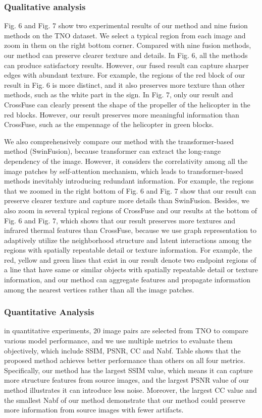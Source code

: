 \documentclass[journal]{IEEEtran}
\begin{document}
\subsubsection{Qualitative analysis}
Fig. 6 and Fig. 7 show two experimental results of our method and nine fusion methods on the TNO dataset. We select a typical region from each image and zoom in them on the right bottom corner. Compared with nine fusion methods, our method can preserve clearer texture and details. In Fig. 6, all the methods can produce satisfactory results. However, our fused result can capture sharper edges with abundant texture. For example, the regions of the red block of our result in Fig. 6 is more distinct, and it also preserves more texture than other methods, such as the white part in the sign. In Fig. 7, only our result and CrossFuse can clearly present the shape of the propeller of the helicopter in the red blocks. However, our result preserves more meaningful information than CrossFuse, such as the empennage of the helicopter in green blocks.

We also comprehensively compare our method with the transformer-based method (SwinFusion), because transformer can extract the long-range dependency of the image. However, it considers the correlativity among all the image patches by self-attention mechanism, which leads to transformer-based methods inevitably introducing redundant information. For example, the regions that we zoomed in the right bottom of Fig. 6 and Fig. 7 show that our result can preserve clearer texture and capture more details than SwinFusion. Besides, we also zoom in several typical regions of CrossFuse and our results at the bottom of Fig. 6 and Fig. 7, which shows that our result preserves more textures and infrared thermal features than CrossFuse, because we use graph representation to adaptively utilize the neighborhood structure and latent interactions among the regions with spatially repeatable detail or texture information. For example, the red, yellow and green lines that exist in our result denote two endpoint regions of a line that have same or similar objects with spatially repeatable detail or texture information, and our method can aggregate features and propagate information among the nearest vertices rather than all the image patches.


\subsubsection{Quantitative Analysis}
in quantitative experiments, 20 image pairs are selected from TNO to compare various model performance, and we use multiple metrics to evaluate them objectively, which include SSIM, PSNR, CC and Nabf. Table \uppercase\expandafter{} shows that the proposed method achieves better performance than others on all four metrics. Specifically, our method has the largest SSIM value, which means it can capture more structure features from source images, and the largest PSNR value of our method illustrates it can introduce less noise. Moreover, the largest CC value and the smallest Nabf of our method demonstrate that our method could preserve more information from source images with fewer artifacts.
\end{document}

